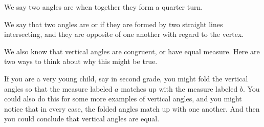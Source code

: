 \documentclass{ximera}
\begin{document}
We say two angles are  when together they form a quarter turn.

\begin{center}
\end{center}

We say that two angles are  or  if they are formed by two straight lines intersecting, and they are opposite of one another with regard to the vertex.
\begin{center}
\end{center}

We also know that vertical angles are congruent, or have equal measure. Here are two ways to think about why this might be true.

\begin{example}
If you are a very young child, say in second grade, you might fold the vertical angles so that the measure labeled $a$ matches up with the measure labeled $b$. You could also do this for some more examples of vertical angles, and you might notice that in every case, the folded angles match up with one another. And then you could conclude that vertical angles are equal.
\end{example}
\end{document}
